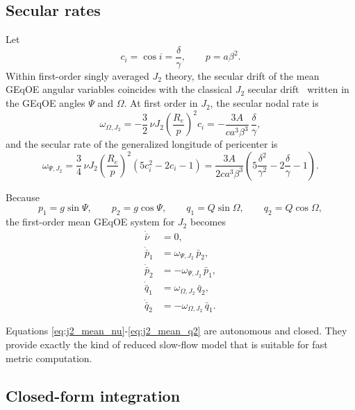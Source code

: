 \documentclass[11pt]{article}
\begin{document}
\subsection{Secular rates}

Let
\begin{equation}
c_i = \cos i = \frac{\delta}{\gamma},
\qquad
p = a\beta^2.
\end{equation}
Within first-order singly averaged $J_2$ theory, the secular drift of the mean
GEqOE angular variables coincides with the classical $J_2$ secular
drift~\cite{brouwer1959,kozai1959} written in the GEqOE angles $\Psi$ and
$\Omega$.
At first order in $J_2$, the secular nodal rate is
\begin{equation}
\omega_{\Omega,J_2}
= -\frac{3}{2}\,\nu J_2
\left(\frac{R_e}{p}\right)^2 c_i
= -\frac{3A}{c a^3 \beta^3}\,\frac{\delta}{\gamma},
\label{eq:OmegaJ2}
\end{equation}
and the secular rate of the generalized longitude of pericenter is
\begin{equation}
\omega_{\Psi,J_2}
= \frac{3}{4}\,\nu J_2
\left(\frac{R_e}{p}\right)^2
\left(5c_i^2 - 2c_i - 1\right)
= \frac{3A}{2c a^3 \beta^3}
\left(
5\frac{\delta^2}{\gamma^2}
- 2\frac{\delta}{\gamma}
- 1
\right).
\label{eq:PsiJ2}
\end{equation}

Because
\begin{equation}
p_1 = g\sin\Psi,
\qquad
p_2 = g\cos\Psi,
\qquad
q_1 = Q\sin\Omega,
\qquad
q_2 = Q\cos\Omega,
\end{equation}
the first-order mean GEqOE system for $J_2$ becomes
\begin{align}
\dot{\bar\nu} &= 0, \label{eq:j2_mean_nu}\\
\dot{\bar p}_1 &= \omega_{\Psi,J_2}\,\bar p_2, \label{eq:j2_mean_p1}\\
\dot{\bar p}_2 &= -\omega_{\Psi,J_2}\,\bar p_1, \label{eq:j2_mean_p2}\\
\dot{\bar q}_1 &= \omega_{\Omega,J_2}\,\bar q_2, \label{eq:j2_mean_q1}\\
\dot{\bar q}_2 &= -\omega_{\Omega,J_2}\,\bar q_1. \label{eq:j2_mean_q2}
\end{align}

Equations \eqref{eq:j2_mean_nu}-\eqref{eq:j2_mean_q2} are autonomous and closed.
They provide exactly the kind of reduced slow-flow model that is suitable for
fast metric computation.

\subsection{Closed-form integration}
\end{document}
